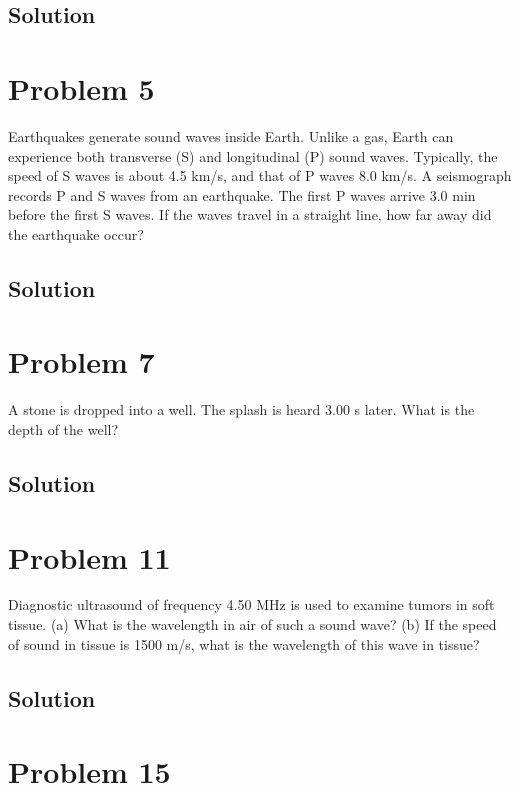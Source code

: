 \documentclass[12pt]{article}
\begin{document}
        \subsection{Solution}

    \pagebreak
    \section{Problem 5}
        Earthquakes generate sound waves inside Earth.
        Unlike a gas, Earth can experience both transverse (S) and longitudinal (P) sound waves. 
        Typically, the speed of S waves is about 4.5 km/s, and that of P waves 8.0 km/s. 
        A seismograph records P and S waves from an earthquake. 
        The first P waves arrive 3.0 min before the first S waves. 
        If the waves travel in a straight line, how far away did the earthquake occur?

        \subsection{Solution}

    \pagebreak
    \section{Problem 7}
        A stone is dropped into a well. 
        The splash is heard 3.00 s later. 
        What is the depth of the well?

        \subsection{Solution}

    \pagebreak
    \section{Problem 11}
        Diagnostic ultrasound of frequency 4.50 MHz is used to examine tumors in soft tissue. 
        (a) What is the wavelength in air of such a sound wave? 
        (b) If the speed of sound in tissue is 1500 m/s, what is the wavelength of this wave in tissue?

        \subsection{Solution}

    \pagebreak
    \section{Problem 15}
\end{document}
